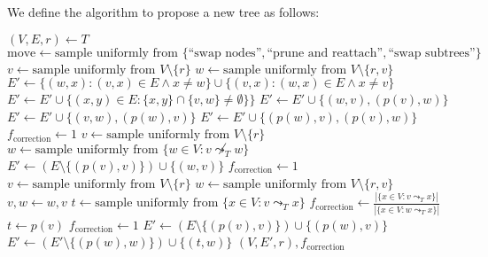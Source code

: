
\begin{definition} We define the algorithm to propose a new tree as follows:
    \begin{algorithmic}
            \State $(V, E, r) \leftarrow T$
            \State $\mathrm{move} \leftarrow \text{sample uniformly from } \{\text{``swap nodes''}, \text{``prune and reattach''}, \text{``swap subtrees''}\}$
                \State $v \leftarrow \text{sample uniformly from } V \setminus \{r\}$
                \State $w \leftarrow \text{sample uniformly from } V \setminus \{r, v\}$
                \State $E' \leftarrow \{(w, x) : (v, x) \in E \wedge x \neq w\} \cup \{(v, x) : (w, x) \in E \wedge x \neq v\}$
                \State $E' \leftarrow E' \cup \{(x, y) \in E: \{x, y\} \cap \{v, w\} \neq \emptyset\}\}$
                    \State $E' \leftarrow E' \cup \{(w, v), (p(v), w)\}$
                    \State $E' \leftarrow E' \cup \{(v, w), (p(w), v)\}$
                \Else
                    \State $E' \leftarrow E' \cup \{(p(w), v), (p(v), w)\}$
                \EndIf
                \State $f_\mathrm{correction} \leftarrow 1$
                \State $v \leftarrow \text{sample uniformly from } V \setminus \{r\}$
                \State $w \leftarrow \text{sample uniformly from } \{w \in V : v \not\leadsto_T w\}$
                \State $E' \leftarrow \left(E \setminus \{(p(v), v)\}\right)  \cup \{(w, v)\}$
                \State $f_\mathrm{correction} \leftarrow 1$
                \State $v \leftarrow \text{sample uniformly from } V \setminus \{r\}$
                \State $w \leftarrow \text{sample uniformly from } V \setminus \{r, v\}$
                    \State $v, w \leftarrow w, v$
                \EndIf
                    \State $t \leftarrow \text{sample uniformly from } \{x \in V: v \leadsto_T x\}$
                    \State $f_\mathrm{correction} \leftarrow \frac{|\{x \in V : v \leadsto_T x\}|}{|\{x \in V : w \leadsto_T x\}|}$
                \Else
                    \State $t \leftarrow p(v)$
                    \State $f_\mathrm{correction} \leftarrow 1$
                \EndIf
                \State $E' \leftarrow (E \setminus \{(p(v), v)\}) \cup \{(p(w), v)\}$ 
                \State $E' \leftarrow (E' \setminus \{(p(w), w)\}) \cup \{(t, w)\}$
            \EndIf
            \State \Return $(V, E', r), f_\mathrm{correction}$
        \EndFunction
    \end{algorithmic}
\end{definition}

